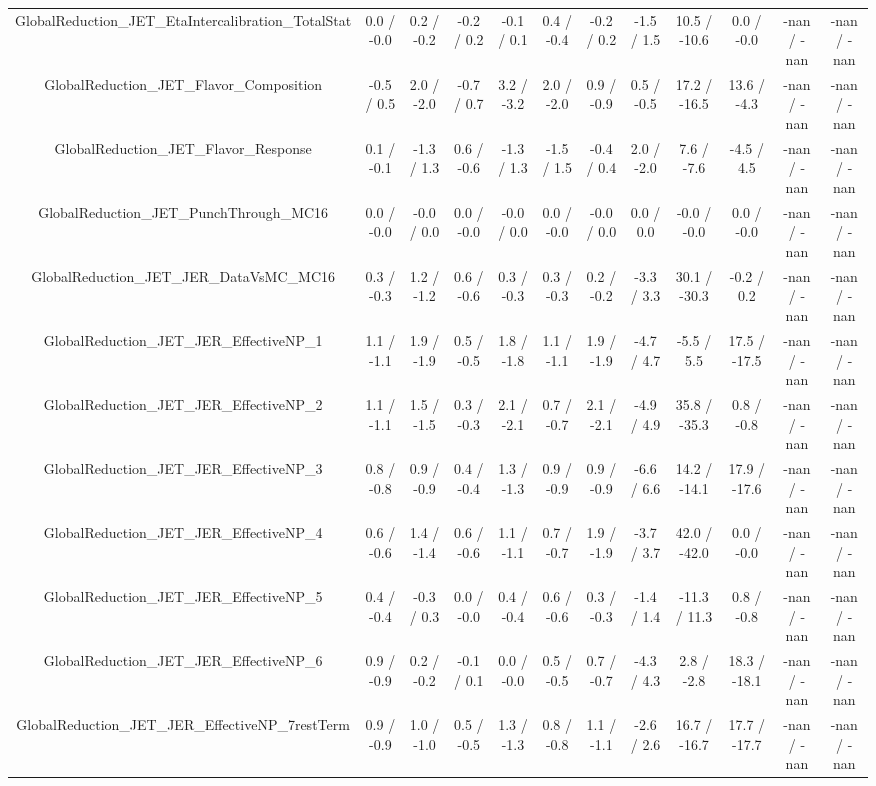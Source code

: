 \begin{table}[htbp]
\begin{center}
\begin{tabular}{|c|c|c|c|c|c|c|c|c|c|c|c|}
  GlobalReduction_JET_EtaIntercalibration_TotalStat & 0.0 / -0.0 & 0.2 / -0.2 & -0.2 / 0.2 & -0.1 / 0.1 & 0.4 / -0.4 & -0.2 / 0.2 & -1.5 / 1.5 & 10.5 / -10.6 & 0.0 / -0.0 & -nan / -nan & -nan / -nan \\ 
  GlobalReduction_JET_Flavor_Composition & -0.5 / 0.5 & 2.0 / -2.0 & -0.7 / 0.7 & 3.2 / -3.2 & 2.0 / -2.0 & 0.9 / -0.9 & 0.5 / -0.5 & 17.2 / -16.5 & 13.6 / -4.3 & -nan / -nan & -nan / -nan \\ 
  GlobalReduction_JET_Flavor_Response & 0.1 / -0.1 & -1.3 / 1.3 & 0.6 / -0.6 & -1.3 / 1.3 & -1.5 / 1.5 & -0.4 / 0.4 & 2.0 / -2.0 & 7.6 / -7.6 & -4.5 / 4.5 & -nan / -nan & -nan / -nan \\ 
  GlobalReduction_JET_PunchThrough_MC16 & 0.0 / -0.0 & -0.0 / 0.0 & 0.0 / -0.0 & -0.0 / 0.0 & 0.0 / -0.0 & -0.0 / 0.0 & 0.0 / 0.0 & -0.0 / -0.0 & 0.0 / -0.0 & -nan / -nan & -nan / -nan \\ 
  GlobalReduction_JET_JER_DataVsMC_MC16 & 0.3 / -0.3 & 1.2 / -1.2 & 0.6 / -0.6 & 0.3 / -0.3 & 0.3 / -0.3 & 0.2 / -0.2 & -3.3 / 3.3 & 30.1 / -30.3 & -0.2 / 0.2 & -nan / -nan & -nan / -nan \\ 
  GlobalReduction_JET_JER_EffectiveNP_1 & 1.1 / -1.1 & 1.9 / -1.9 & 0.5 / -0.5 & 1.8 / -1.8 & 1.1 / -1.1 & 1.9 / -1.9 & -4.7 / 4.7 & -5.5 / 5.5 & 17.5 / -17.5 & -nan / -nan & -nan / -nan \\ 
  GlobalReduction_JET_JER_EffectiveNP_2 & 1.1 / -1.1 & 1.5 / -1.5 & 0.3 / -0.3 & 2.1 / -2.1 & 0.7 / -0.7 & 2.1 / -2.1 & -4.9 / 4.9 & 35.8 / -35.3 & 0.8 / -0.8 & -nan / -nan & -nan / -nan \\ 
  GlobalReduction_JET_JER_EffectiveNP_3 & 0.8 / -0.8 & 0.9 / -0.9 & 0.4 / -0.4 & 1.3 / -1.3 & 0.9 / -0.9 & 0.9 / -0.9 & -6.6 / 6.6 & 14.2 / -14.1 & 17.9 / -17.6 & -nan / -nan & -nan / -nan \\ 
  GlobalReduction_JET_JER_EffectiveNP_4 & 0.6 / -0.6 & 1.4 / -1.4 & 0.6 / -0.6 & 1.1 / -1.1 & 0.7 / -0.7 & 1.9 / -1.9 & -3.7 / 3.7 & 42.0 / -42.0 & 0.0 / -0.0 & -nan / -nan & -nan / -nan \\ 
  GlobalReduction_JET_JER_EffectiveNP_5 & 0.4 / -0.4 & -0.3 / 0.3 & 0.0 / -0.0 & 0.4 / -0.4 & 0.6 / -0.6 & 0.3 / -0.3 & -1.4 / 1.4 & -11.3 / 11.3 & 0.8 / -0.8 & -nan / -nan & -nan / -nan \\ 
  GlobalReduction_JET_JER_EffectiveNP_6 & 0.9 / -0.9 & 0.2 / -0.2 & -0.1 / 0.1 & 0.0 / -0.0 & 0.5 / -0.5 & 0.7 / -0.7 & -4.3 / 4.3 & 2.8 / -2.8 & 18.3 / -18.1 & -nan / -nan & -nan / -nan \\ 
  GlobalReduction_JET_JER_EffectiveNP_7restTerm & 0.9 / -0.9 & 1.0 / -1.0 & 0.5 / -0.5 & 1.3 / -1.3 & 0.8 / -0.8 & 1.1 / -1.1 & -2.6 / 2.6 & 16.7 / -16.7 & 17.7 / -17.7 & -nan / -nan & -nan / -nan \\ 

\end{tabular}
\end{center}
\end{table}
